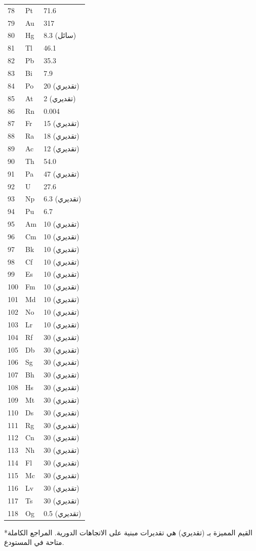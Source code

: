 \documentclass[11pt,a4paper]{article}
\begin{document}
\begin{otherlanguage}{arabic}
\begin{longtable}{p{0.6cm}p{1.2cm}p{1.5cm}}
			78 & Pt & 71.6 \\
			79 & Au & 317 \\
			80 & Hg & 8.3 (سائل) \\
			81 & Tl & 46.1 \\
			82 & Pb & 35.3 \\
			83 & Bi & 7.9 \\
			84 & Po & 20 (تقديري) \\
			85 & At & 2 (تقديري) \\
			86 & Rn & 0.004 \\
			87 & Fr & 15 (تقديري) \\
			88 & Ra & 18 (تقديري) \\
			89 & Ac & 12 (تقديري) \\
			90 & Th & 54.0 \\
			91 & Pa & 47 (تقديري) \\
			92 & U  & 27.6 \\
			93 & Np & 6.3 (تقديري) \\
			94 & Pu & 6.7 \\
			95 & Am & 10 (تقديري) \\
			96 & Cm & 10 (تقديري) \\
			97 & Bk & 10 (تقديري) \\
			98 & Cf & 10 (تقديري) \\
			99 & Es & 10 (تقديري) \\
			100& Fm & 10 (تقديري) \\
			101& Md & 10 (تقديري) \\
			102& No & 10 (تقديري) \\
			103& Lr & 10 (تقديري) \\
			104& Rf & 30 (تقديري) \\
			105& Db & 30 (تقديري) \\
			106& Sg & 30 (تقديري) \\
			107& Bh & 30 (تقديري) \\
			108& Hs & 30 (تقديري) \\
			109& Mt & 30 (تقديري) \\
			110& Ds & 30 (تقديري) \\
			111& Rg & 30 (تقديري) \\
			112& Cn & 30 (تقديري) \\
			113& Nh & 30 (تقديري) \\
			114& Fl & 30 (تقديري) \\
			115& Mc & 30 (تقديري) \\
			116& Lv & 30 (تقديري) \\
			117& Ts & 30 (تقديري) \\
			118& Og & 0.5 (تقديري) \\
			\bottomrule
		\end{longtable}
		*القيم المميزة بـ (تقديري) هي تقديرات مبنية على الاتجاهات الدورية. المراجع الكاملة متاحة في المستودع.
		

\end{otherlanguage}
\end{document}
